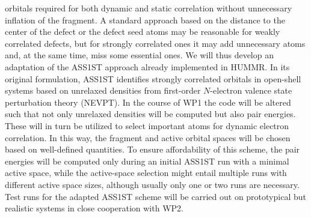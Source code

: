 \documentclass[a4paper,11pt,headings=normal]{scrartcl}
\begin{document}
orbitals required for both dynamic and static correlation without 
unnecessary inflation of the fragment. A standard approach based on the 
distance to the center of the defect or the defect seed atoms may be reasonable 
for weakly correlated defects, but for strongly correlated ones it may add 
unnecessary atoms and, at the same time, miss some essential ones. We will thus 
develop an adaptation of the ASS1ST approach already implemented in 
HUMMR.\autocite{Roemelt2019, Roemelt2020} In its original formulation, ASS1ST 
identifies strongly correlated orbitals in open-shell systems based on 
unrelaxed densities from first-order $N$-electron valence state perturbation 
theory (NEVPT). In the course of WP1 the code will be altered such 
that not only unrelaxed densities will be computed but also pair energies. 
These will in turn be utilized to select important atoms for dynamic electron 
correlation. In this way, the fragment and active orbital spaces will be chosen 
based on well-defined quantities. To ensure affordability of this scheme, the 
pair energies will be computed only during an initial ASS1ST run with a minimal 
active space, while the active-space selection might entail multiple runs with 
different active space sizes, although usually only one or two runs are 
necessary.\autocite{Roemelt2020a,Nam2024} Test runs for the adapted ASS1ST 
scheme will be carried out on prototypical but realistic systems in close 
cooperation with WP2.\\
\end{document}
